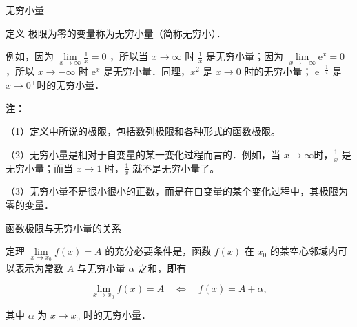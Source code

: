 \documentclass[aspectratio=169,10pt]{ctexbeamer}
\begin{document}
\begin{frame}{无穷小量}
	\begin{block}{定义}
		极限为零的变量称为无穷小量（简称无穷小）．
	\end{block}
	\pause
	例如，因为 $\lim\limits _{x \rightarrow \infty} \frac{1}{x}=0$ ，所以当 $x \rightarrow \infty$ 时 $\frac{1}{x}$ 是无穷小量；因为 $\lim\limits _{x \rightarrow-\infty} \mathrm{e}^x=0$ ，所以 $x \rightarrow-\infty$ 时 $\mathrm{e}^x$ 是无穷小量．同理，$x^2$ 是 $x \rightarrow 0$ 时的无穷小量； $\mathrm{e}^{-\frac{1}{x}}$ 是$x \rightarrow 0^{+}$时的无穷小量．
	
	\textbf{注：}
	
	（1）定义中所说的极限，包括数列极限和各种形式的函数极限。
	
	（2）无穷小量是相对于自变量的某一变化过程而言的．例如，当 $x \rightarrow \infty$时，$\frac{1}{x}$ 是无穷小量；而当 $x \rightarrow 1$ 时，$\frac{1}{x}$ 就不是无穷小量了。
	
	（3）无穷小量不是很小很小的正数，而是在自变量的某个变化过程中，其极限为零的变量．
	
	
	
	
\end{frame}

\begin{frame}{函数极限与无穷小量的关系}
	\large
	\begin{block}{定理}
		$\lim\limits _{x \rightarrow x_0} f(x)=A$ 的充分必要条件是，函数 $f(x)$ 在 $x_0$ 的某空心邻域内可以表示为常数 $A$ 与无穷小量 $\alpha$ 之和，即有
		
		$$
		\lim\limits _{x \rightarrow x_0} f(x)=A \quad \Longleftrightarrow \quad f(x)=A+\alpha,
		$$
		
		其中 $\alpha$ 为 $x \rightarrow x_0$ 时的无穷小量．
	\end{block}
	
	
\end{frame}
\end{document}
